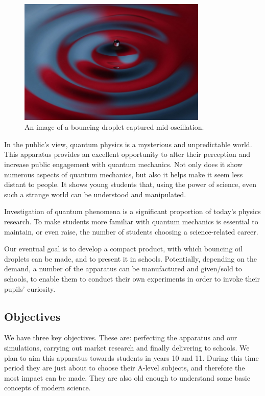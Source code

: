 \begin{center}
\begin{figure}[htb]
\centering
    \includegraphics[width=8.996cm,height=5.997cm]{education/STFCproposal/Droplet_STFC.jpg}
    \caption{An image of a bouncing droplet captured mid-oscillation.}
    \label{fig:droplet_STFC_report}
\end{figure} 
\end{center}

In the public's view, quantum physics is a mysterious and unpredictable world. This apparatus provides an excellent opportunity to alter their perception and increase public engagement with quantum mechanics. Not only does it show numerous aspects of quantum mechanics, but also it helps make it seem less distant to people. It shows young students that, using the power of science, even such a strange world can be understood and manipulated.

Investigation of quantum phenomena is a significant proportion of today's physics research. To make students more familiar with quantum mechanics is essential to maintain, or even raise, the number of students choosing a science-related career.

Our eventual goal is to develop a compact product, with which bouncing oil droplets can be made, and to present it in schools. Potentially, depending on the demand, a number of the apparatus can be manufactured and given/sold to schools, to enable them to conduct their own experiments in order to invoke their pupils' curiosity. 

\subsection{Objectives}

We have three key objectives. These are: perfecting the apparatus and our simulations, carrying out market research and finally delivering to schools. We plan to aim this apparatus towards students in years 10 and 11. During this time period they are just about to choose their A-level subjects, and therefore the most impact can be made. They are also old enough to understand some basic concepts of modern science.

